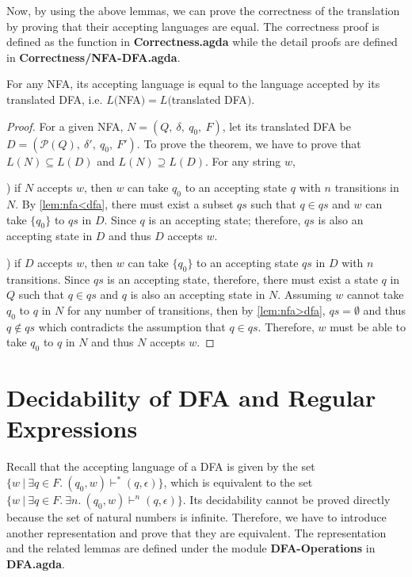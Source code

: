 \par Now, by using the above lemmas, we can prove the correctness of
the translation by proving that their accepting languages are
equal. The correctness proof is defined as the function  in \textbf{Correctness.agda} while the detail
proofs are defined in \textbf{Correctness/NFA-DFA.agda}. 

\begin{thm}
\noindent For any NFA, its accepting language is equal to
the language accepted by its translated DFA, i.e. \(L(\)NFA\()
= L(\)translated DFA\()\). 
\end{thm}

\begin{proof}
\noindent For a given NFA, \(N = (Q,\ \delta,\ q_0,\ F)\), let its
translated DFA be \(D = (\mathcal P \left({Q}\right),\ \delta',\
{q_0},\ F')\). To
prove the theorem, we have to prove that \(L(N) \subseteq L(D)\) and
\(L(N) \supseteq L(D)\). For any string \(w\), 

\par {}) if \(N\) accepts \(w\), then \(w\) can take \(q_0\) to an
accepting state \(q\) with \(n\) transitions in \(N\). By
\autoref{lem:nfa<dfa}, there must exist a subset \(qs\) such that
\(q \in qs\) and \(w\)
can take \(\{q_0\}\) to \(qs\) in \(D\). Since \(q\) is
an accepting state; therefore, \(qs\) is also an accepting state in
\(D\) and thus \(D\) accepts \(w\). 

\par {}) if \(D\) accepts \(w\), then \(w\) can take
\(\{q_0\}\) to an accepting state \(qs\) in \(D\) with \(n\)
transitions. Since \(qs\) is an accepting state, therefore, there must
exist a state \(q\) in \(Q\) such that \(q \in qs\) and \(q\) is also
an accepting state in \(N\). Assuming \(w\) cannot take \(q_0\) to
\(q\) in \(N\) for any number of transitions, then by
\autoref{lem:nfa>dfa}, \(qs = \emptyset\) and thus \(q \notin qs\) which contradicts the assumption that \(q \in
qs\). Therefore, \(w\) must be able to take \(q_0\) to \(q\) in \(N\) and thus \(N\) accepts \(w\). 
\end{proof}


\section{Decidability of DFA and Regular Expressions}
\par Recall that the accepting language of a DFA is given by the set
\(\{w\ |\ \exists q\in F.\ (q_0,w) \vdash^* (q,\epsilon)\}\), which is
equivalent to the set \(\{w\ |\ \exists q\in F.\ \exists n.\ (q_0,w) \vdash^n (q,\epsilon)\}\). 
Its decidability cannot be proved directly because the set of natural
numbers is infinite. Therefore, we have to
introduce another representation and prove
that they are equivalent. The representation and the related lemmas are
defined under the module \textbf{DFA-Operations} in \textbf{DFA.agda}. 

